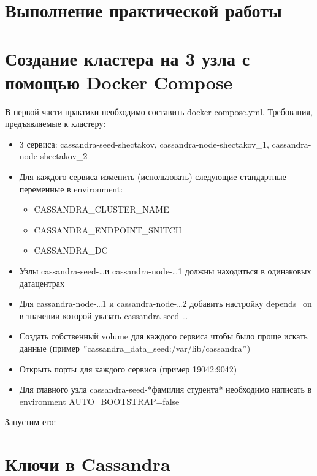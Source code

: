 \graphicspath{{img}} %

\section*{\LARGE Выполнение практической работы}

\section{Создание кластера на 3 узла с помощью Docker Compose}

В первой части практики необходимо составить docker-compose.yml.
Требования, предъявляемые к кластеру:
\begin{itemize}
	\item 3 сервиса: cassandra-seed-shectakov, cassandra-node-shectakov\_1, cassandra-node-shectakov\_2
	\item Для каждого сервиса изменить (использовать) следующие
	стандартные переменные в environment:
	\begin{itemize}
		\item CASSANDRA\_CLUSTER\_NAME
		\item CASSANDRA\_ENDPOINT\_SNITCH
		\item CASSANDRA\_DC
	\end{itemize}
	\item Узлы cassandra-seed-\ldots и cassandra-node-\ldots1 должны
	находиться в одинаковых датацентрах
	\item Для cassandra-node-\ldots1 и cassandra-node-\ldots2 добавить
	настройку depends\_on в значении которой указать cassandra-seed-\ldots
	\item Создать собственный volume для каждого сервиса чтобы было проще
	искать данные (пример \("\)cassandra\_data\_seed:/var/lib/cassandra\("\))
	\item Открыть порты для каждого сервиса (пример 19042:9042)
	\item Для главного узла cassandra-seed-*фамилия студента*
	необходимо написать в environment AUTO\_BOOTSTRAP=false
\end{itemize}



Запустим его:


\section{Ключи в Cassandra}

